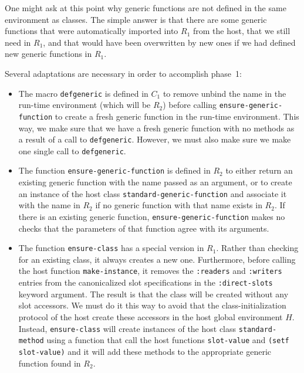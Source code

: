 One might ask at this point why generic functions are not defined in
the same environment as classes.  The simple answer is that there are
some generic functions that were automatically imported into $R_1$
from the host, that we still need in $R_1$, and that would have been
overwritten by new ones if we had defined new generic functions in
$R_1$.

Several adaptations are necessary in order to accomplish phase~1:

\begin{itemize}
\item The macro \texttt{defgeneric} is defined in $C_1$ to remove
  unbind the name in the run-time environment (which will be $R_2$)
  before calling \texttt{ensure-generic-function} to create a fresh
  generic function in the run-time environment.  This way, we make
  sure that we have a fresh generic function with no methods as a
  result of a call to \texttt{defgeneric}.  However, we must also make
  sure we make one single call to \texttt{defgeneric}.
\item The function \texttt{ensure-generic-function} is defined in
  $R_2$ to either return an existing generic function with the name
  passed as an argument, or to create an instance of the host class
  \texttt{standard-generic-function} and associate it with the name in
  $R_2$ if no generic function with that name exists in $R_2$.  If
  there is an existing generic function,
  \texttt{ensure-generic-function} makes no checks that the parameters
  of that function agree with its arguments.
\item The function \texttt{ensure-class} has a special version in
  $R_1$.  Rather than checking for an existing class, it always
  creates a new one.  Furthermore, before calling the host function
  \texttt{make-instance}, it removes the \texttt{:readers} and
  \texttt{:writers} entries from the canonicalized slot specifications
  in the \texttt{:direct-slots} keyword argument.  The result is that
  the class will be created without any slot accessors.  We must do it
  this way to avoid that the class-initialization protocol of the host
  create these accessors in the host global environment $H$.  Instead,
  \texttt{ensure-class} will create instances of the host class
  \texttt{standard-method} using a function that call the host
  functions \texttt{slot-value} and \texttt{(setf slot-value)} and it
  will add these methods to the appropriate generic function found in
  $R_2$.
\end{itemize}

